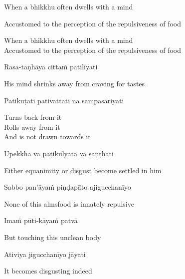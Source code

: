 \ifninebythirteen

\begin{english}
  When a bhikkhu often dwells with a mind
\end{english}
\begin{english-hang}
  Accustomed to the perception of the repulsiveness of food
\end{english-hang}

\else

\begin{english}
  When a bhikkhu often dwells with a mind\\
  Accustomed to the perception of the repulsiveness of food
\end{english}

\fi

Rasa-taṇhāya cittaṁ patilīyati

\begin{english}
  His mind shrinks away from craving for tastes
\end{english}

Patikuṭati pativattati na sampasāriyati

\begin{english-verses}
  Turns back from it\\
  Rolls away from it\\
  And is not drawn towards it
\end{english-verses}

Upekkhā vā pāṭikulyatā vā saṇṭhāti

\begin{english}
  Either equanimity or disgust become settled in him
\end{english}

\suttaRef{[AN 7.49]}

\ifninebythirteen\clearpage\fi

Sabbo pan'āyaṁ piṇḍapāto ajigucchanīyo

\begin{english}
  None of this almsfood is innately repulsive
\end{english}

Imaṁ pūti-kāyaṁ patvā

\begin{english}
  But touching this unclean body
\end{english}

Ativiya jigucchanīyo jāyati

\begin{english}
  It becomes disgusting indeed
\end{english}

